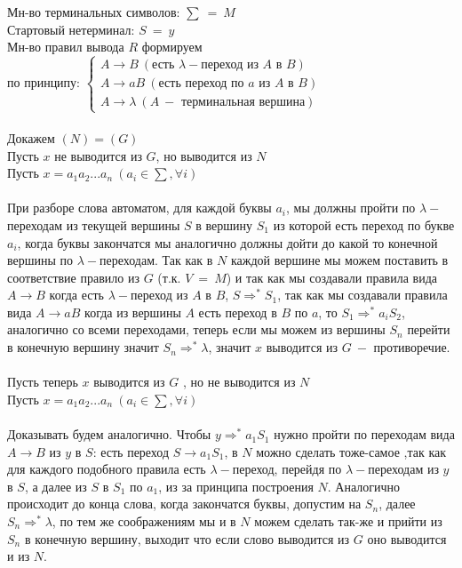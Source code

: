 \documentclass[10pt]{article}
\begin{document}
{\begin{enumerate}
		Мн-во терминальных символов: $\sum\ =\ M$\\
		Стартовый нетерминал: $S\ =\ y$\\
		Мн-во правил вывода $R$ формируем\\по принципу: $\begin{cases} A\rightarrow B\ (\text{есть }\lambda-\text{переход из }A\text{ в }B)\\A\rightarrow aB\ (\text{есть переход по } a\text{ из }A\text{ в }B)\\A\rightarrow\lambda\ (A\ -\text{ терминальная вершина}) \end{cases}$\\\\
		Докажем $(N)=(G)$\\
		Пусть $x$ не выводится из $G$, но выводится из $N$\\
		Пусть $x=a_1a_2...a_n\ (a_i \in \sum, \forall i)$\\\\
		При разборе слова автоматом, для каждой буквы $a_i$, мы должны пройти по $\lambda-$переходам из текущей вершины $S$ в вершину $S_1$ из которой есть переход по букве $a_i$, когда буквы закончатся мы аналогично должны дойти до какой то конечной вершины по $\lambda-$переходам.
		Так как в $N$ каждой вершине мы можем поставить в соответствие правило из $G$ (т.к. $V\ =\ M$) и так как мы создавали правила вида $A\rightarrow B$ когда есть $\lambda-$переход из $A$ в $B$, $S\Rightarrow^*S_1$, так как мы создавали правила вида $A\rightarrow aB$ когда из вершины $A$ есть переход в $B$ по $a$, то $S_1\Rightarrow^*a_iS_2$, аналогично со всеми переходами, теперь если мы можем из вершины $S_n$ перейти в конечную вершину значит $S_n\Rightarrow^*\lambda$, значит $x$ выводится из $G\ -$ противоречие.\\\\
		Пусть теперь $x$ выводится из $G$ , но не выводится из $N$\\
		Пусть $x=a_1a_2...a_n\ (a_i \in \sum, \forall i)$\\\\
		Доказывать будем аналогично. Чтобы $y\Rightarrow^*a_1S_1$ нужно пройти по переходам вида $A\rightarrow B$ из $y$ в $S$: есть переход $S\rightarrow a_1S_1$, в $N$ можно сделать тоже-самое ,так как для каждого подобного правила есть $\lambda-$переход, перейдя по $\lambda-$переходам из $y$ в $S$, а далее из $S$ в $S_1$ по $a_1$, из за принципа построения $N$. Аналогично происходит до конца слова, когда закончатся буквы, допустим на $S_n$, далее $S_n\Rightarrow^*\lambda$, по тем же соображениям мы и в $N$ можем сделать так-же и прийти из $S_n$ в конечную вершину, выходит что если слово выводится из $G$ оно выводится и из $N$.\\\\

\end{enumerate}}
\end{document}
